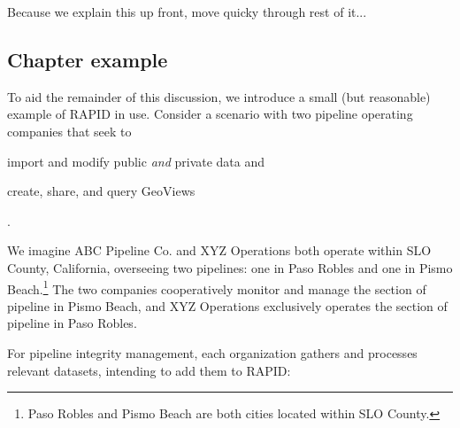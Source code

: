 Because we explain this up front, move quicky through rest of it...

\subsection{Chapter example}
To aid the remainder of this discussion, we introduce a small (but reasonable) example of RAPID in use. Consider a scenario with two pipeline operating companies that seek to
\begin{enumerate*}[label=\itshape\alph*\upshape)]
\item import and modify public \textit{and} private data and
\item create, share, and query GeoViews
\end{enumerate*}.

We imagine ABC Pipeline Co. and XYZ Operations both operate within SLO County, California, overseeing two pipelines: one in Paso Robles and one in Pismo Beach.\footnote{Paso Robles and Pismo Beach are both cities located within SLO County.} The two companies cooperatively monitor and manage the section of pipeline in Pismo Beach, and XYZ Operations exclusively operates the section of pipeline in Paso Robles.

For pipeline integrity management, each organization gathers and processes relevant datasets, intending to add them to RAPID:

